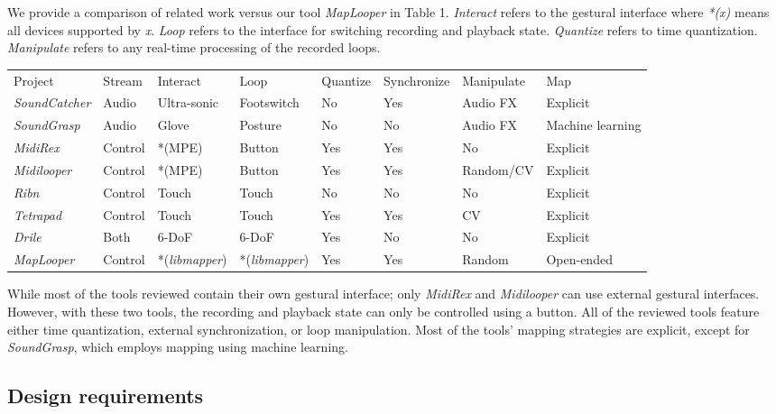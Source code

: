 \documentclass[sigconf]{nimeart}
\begin{document}
We provide a comparison of related work versus our tool \emph{MapLooper} in Table 1. \emph{Interact} refers to the gestural interface where \emph{*(x)} means all devices supported by \emph{x}. \emph{Loop} refers to the interface for switching recording and playback state. \emph{Quantize} refers to time quantization. \emph{Manipulate} refers to any real-time processing of the recorded loops.

\begin{table}[htbp]\centering\small
\begin{adjustbox}{max width=\textwidth}\begin{tabular}{llllllll}
\toprule
\midrule
Project & Stream & Interact & Loop & Quantize & Synchronize & Manipulate & Map \\
\emph{SoundCatcher} & Audio & Ultra-sonic & Footswitch & No & Yes & Audio FX & Explicit \\
\emph{SoundGrasp} & Audio & Glove & Posture & No & No & Audio FX & Machine learning \\
\emph{MidiRex} & Control & *(MPE) & Button & Yes & Yes & No & Explicit \\
\emph{Midilooper} & Control & *(MPE) & Button & Yes & Yes & Random/CV & Explicit \\
\emph{Ribn} & Control & Touch & Touch & No & No & No & Explicit \\
\emph{Tetrapad} & Control & Touch & Touch & Yes & Yes & CV & Explicit \\
\emph{Drile} & Both & 6-DoF & 6-DoF & Yes & No & No & Explicit \\
\emph{MapLooper} & Control & *(\emph{libmapper}) & *(\emph{libmapper}) & Yes & Yes & Random & Open-ended \\
\bottomrule
\end{tabular}\end{adjustbox}\end{table}

While most of the tools reviewed contain their own gestural interface; only \emph{MidiRex} and \emph{Midilooper} can use external gestural interfaces. However, with these two tools, the recording and playback state can only be controlled using a button. All of the reviewed tools feature either time quantization, external synchronization, or loop manipulation. Most of the tools' mapping strategies are explicit, except for \emph{SoundGrasp}, which employs mapping using machine learning.

\subsection{Design requirements}\label{design-requirements}
\end{document}
